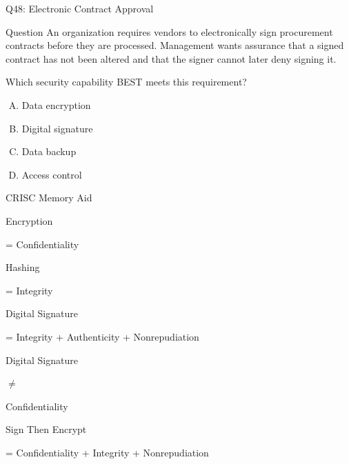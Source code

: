 \documentclass{beamer}
\begin{document}
	\begin{frame}[shrink=10]{Q48: Electronic Contract Approval}
		\begin{block}{Question}
			An organization requires vendors to electronically sign
			procurement contracts before they are processed. Management
			wants assurance that a signed contract has not been altered
			and that the signer cannot later deny signing it.
			
			Which security capability BEST meets this requirement?
		\end{block}
		
		\begin{enumerate}[(A)]
			\item Data encryption
			\item Digital signature
			\item Data backup
			\item Access control
		\end{enumerate}
				\begin{block}{CRISC Memory Aid}
			
			Encryption
			
			= Confidentiality
			
			\vspace{0.1cm}
			
			Hashing
			
			= Integrity
			
			\vspace{0.1cm}
			
			Digital Signature
			
			= Integrity + Authenticity + Nonrepudiation
			
			\vspace{0.1cm}
			
			Digital Signature
			
			$\neq$
			
			Confidentiality
			
			\vspace{0.15cm}
			
			Sign Then Encrypt
			
			= Confidentiality + Integrity + Nonrepudiation
			
		\end{block}
	\end{frame}
	
\end{document}
